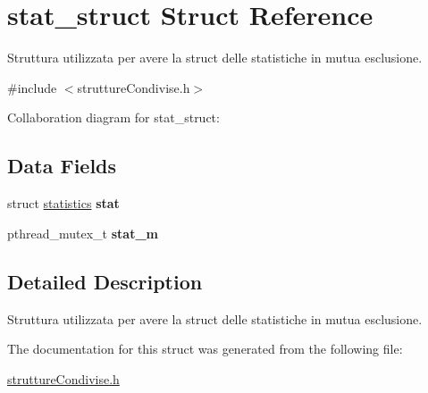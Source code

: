 \hypertarget{structstat__struct}{}\section{stat\+\_\+struct Struct Reference}
\label{structstat__struct}


Struttura utilizzata per avere la struct delle statistiche in mutua esclusione.  




{\ttfamily \#include $<$strutture\+Condivise.\+h$>$}



Collaboration diagram for stat\+\_\+struct\+:
\subsection*{Data Fields}
\begin{DoxyCompactItemize}
\item 
\mbox{\label{structstat__struct_aaf1d79f6e2b80f9c06acc94f63a78e21}} 
struct \hyperlink{structstatistics}{statistics} {\bfseries stat}
\item 
\mbox{\label{structstat__struct_a200100e5e3746203693c99977647eebc}} 
pthread\+\_\+mutex\+\_\+t {\bfseries stat\+\_\+m}
\end{DoxyCompactItemize}


\subsection{Detailed Description}
Struttura utilizzata per avere la struct delle statistiche in mutua esclusione. 

The documentation for this struct was generated from the following file\+:\begin{DoxyCompactItemize}
\item 
\hyperlink{strutture_condivise_8h}{strutture\+Condivise.\+h}\end{DoxyCompactItemize}
